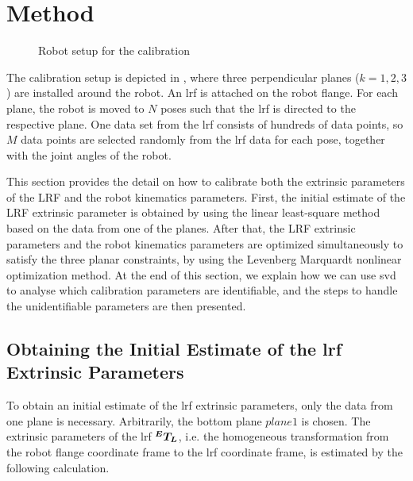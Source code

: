 \section{Method}
\label{sec:method}
\begin{figure}[t]
  \centering
  \vspace*{2mm}
  \caption{Robot setup for the calibration}
  \label{fig:robot_setup}
\end{figure}


The calibration setup is depicted in , where three perpendicular planes ($k=1,2,3$) are installed around the robot. An \ac{lrf} is attached on the robot flange. For each plane, the robot is moved to $N$ poses such that the \ac{lrf} is directed to the respective plane. One data set from the \ac{lrf} consists of hundreds of data points, so $M$ data points are selected randomly from the \ac{lrf} data for each pose, together with the joint angles of the robot. 

This section provides the detail on how to calibrate both the extrinsic parameters of the LRF and the robot kinematics parameters. First, the initial estimate of the LRF extrinsic parameter is obtained by using the linear least-square method based on the data from one of the planes. After that, the LRF extrinsic parameters and the robot kinematics parameters are optimized simultaneously to satisfy the three planar constraints, by using the Levenberg Marquardt nonlinear optimization method. At the end of this section, we explain how we can use \ac{svd} to analyse which calibration parameters are identifiable, and the steps to handle the unidentifiable parameters are then presented. 
\subsection{Obtaining the Initial Estimate of the \ac{lrf} Extrinsic Parameters}
\label{sec:first_step}
To obtain an initial estimate of the \ac{lrf} extrinsic parameters, only the data from one plane is necessary. Arbitrarily, the bottom plane $plane 1$ is chosen. The extrinsic parameters of the \ac{lrf} $\vb*{{^E}T_L}$, i.e. the homogeneous transformation from the robot flange coordinate frame to the \ac{lrf} coordinate frame, is estimated by the following calculation. 

